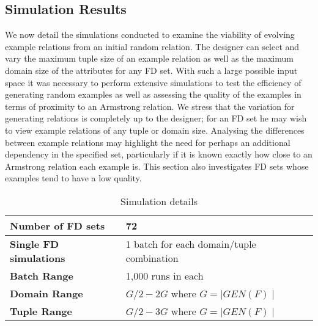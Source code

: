 \subsection{Simulation Results}


We now detail the simulations conducted to examine the
viability of evolving example relations from an initial
random relation. The designer can select and vary the maximum tuple size
of an example relation as well as the maximum domain size of the
attributes for any 
FD set. With such a large possible input space it was necessary to
 perform extensive simulations to test
the efficiency of generating random examples as well as assessing
the quality of the examples in terms of proximity to an Armstrong 
relation. We stress that the
variation for generating relations is completely up to the
designer; for an FD set he may wish to view example relations
of any tuple or domain size. Analysing the differences between example relations
 may highlight the need for perhaps
an additional dependency in the specified set, particularly if it
is known exactly how close to an Armstrong relation each example is. 
This section
also investigates FD sets whose examples tend to have a low
quality.

\medskip

{\line
\begin{table}[ht]
\begin{center}
\begin{tabular}{|l||l|}
\hline
{\bf Number of FD sets}  & 72 \\ \hline
{\bf Single FD simulations} & 1 batch for each domain/tuple combination\\ \hline
{\bf Batch Range} & 1,000 runs in each \\ \hline
{\bf Domain Range} & $G/2 - 2G$ where $ G = \mid GEN(F) \mid$  \\ \hline
{\bf Tuple Range} & $G/2 - 3G$  where $ G = \mid GEN(F) \mid$  \\ \hline 
\end{tabular}
\end{center}
\caption{\label{table:5.01} Simulation details }
\end{table}
}


